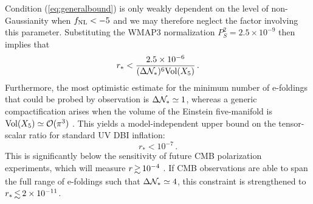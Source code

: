 Condition (\ref{eq:generalbound}) is 
only weakly dependent on the level of non-Gaussianity 
when $f_{\mathrm{NL}} < -5$ and we may therefore neglect the 
factor involving this parameter. 
Substituting the WMAP3 normalization 
$P_S^2 = 2.5 \times 10^{-9}$ then implies that
%  
\begin{equation}
\label{eq:upperbound}
r_{*} < \frac{2.5\times 10^{-6}}{( \Delta {\cal{N}}_*)^6 \mathrm{Vol}(X_5)} \,.
\end{equation}
% 
Furthermore, the most optimistic 
estimate for the minimum number of e-foldings that could be 
probed by observation is $\Delta {\cal{N}}_{*} \simeq 1$, whereas
a generic compactification arises when 
the volume of the Einstein five-manifold is $\mathrm{Vol}(X_5) 
\simeq {\cal{O}} (\pi^3)$ \cite{ks}. This yields a model-independent 
upper bound on the tensor-scalar ratio for standard UV DBI inflation:
%    
\begin{equation}
\label{eq:standardbound}
r_* < 10^{-7} \,.
\end{equation}
% 
This is significantly below the sensitivity 
of future CMB polarization experiments, which will measure 
${r} \, {\gsim} \, 10^{-4}$ \cite{clover,vpj}. 
If CMB  
observations are able to span the full range of e-foldings such that
$\Delta {\cal{N}}_* \simeq 4$, this constraint is strengthened to 
${r_*} \, {\lsim} \, {2 \times 10^{-11}}$.


